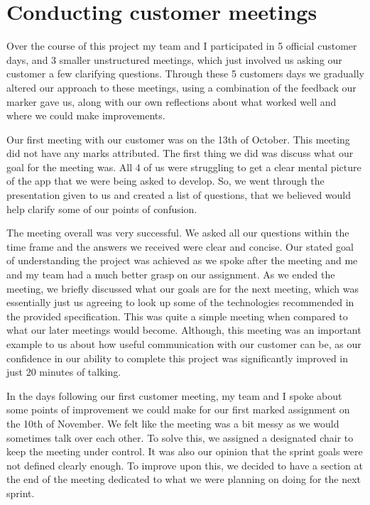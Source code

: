 \documentclass{l3proj}
\begin{document}
\section{Conducting customer meetings}
Over the course of this project my team and I participated in 5 official customer days, and 3 smaller unstructured meetings, which just involved us asking our customer a few clarifying questions. Through these 5 customers days we gradually altered our approach to these meetings, using a combination of the feedback our marker gave us, along with our own reflections about what worked well and where we could make improvements. \par
Our first meeting with our customer was on the 13th of October. This meeting did not have any marks attributed. The first thing we did was discuss what our goal for the meeting was. All 4 of us were struggling to get a clear mental picture of the app that we were being asked to develop. So, we went through the presentation given to us and created a list of questions, that we believed would help clarify some of our points of confusion.\par
The meeting overall was very successful. We asked all our questions within the time frame and the answers we received were clear and concise. Our stated goal of understanding the project was achieved as we spoke after the meeting and me and my team had a much better grasp on our assignment. As we ended the meeting, we briefly discussed what our goals are for the next meeting, which was essentially just us agreeing to look up some of the technologies recommended in the provided specification. This was quite a simple meeting when compared to what our later meetings would become. Although, this meeting was an important example to us about how useful communication with our customer can be, as our confidence in our ability to complete this project was significantly improved in just 20 minutes of talking.\par
In the days following our first customer meeting, my team and I spoke about some points of improvement we could make for our first marked assignment on the 10th of November. We felt like the meeting was a bit messy as we would sometimes talk over each other. To solve this, we assigned a designated chair to keep the meeting under control. It was also our opinion that the sprint goals were not defined clearly enough. To improve upon this, we decided to have a section at the end of the meeting dedicated to what we were planning on doing for the next sprint.\par
\end{document}
